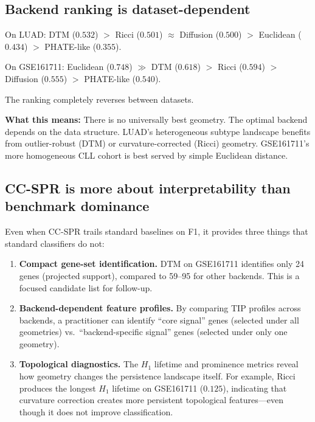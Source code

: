 \documentclass[11pt]{article}
\begin{document}
\subsection{Backend ranking is dataset-dependent}

On LUAD: DTM ($0.532$) $>$ Ricci ($0.501$) $\approx$ Diffusion ($0.500$) $>$ Euclidean ($0.434$) $>$ PHATE-like ($0.355$).

On GSE161711: Euclidean ($0.748$) $\gg$ DTM ($0.618$) $>$ Ricci ($0.594$) $>$ Diffusion ($0.555$) $>$ PHATE-like ($0.540$).

The ranking completely reverses between datasets.

\textbf{What this means:} There is no universally best geometry.
The optimal backend depends on the data structure.
LUAD's heterogeneous subtype landscape benefits from outlier-robust (DTM) or curvature-corrected (Ricci) geometry.
GSE161711's more homogeneous CLL cohort is best served by simple Euclidean distance.

\subsection{CC-SPR is more about interpretability than benchmark dominance}

Even when CC-SPR trails standard baselines on F1, it provides three things that standard classifiers do not:

\begin{enumerate}[leftmargin=1.5em]
\item \textbf{Compact gene-set identification.}
DTM on GSE161711 identifies only 24 genes (projected support), compared to 59--95 for other backends.
This is a focused candidate list for follow-up.

\item \textbf{Backend-dependent feature profiles.}
By comparing TIP profiles across backends, a practitioner can identify ``core signal'' genes (selected under all geometries) vs.\ ``backend-specific signal'' genes (selected under only one geometry).

\item \textbf{Topological diagnostics.}
The $H_1$ lifetime and prominence metrics reveal how geometry changes the persistence landscape itself.
For example, Ricci produces the longest $H_1$ lifetime on GSE161711 ($0.125$), indicating that curvature correction creates more persistent topological features---even though it does not improve classification.
\end{enumerate}
\end{document}

